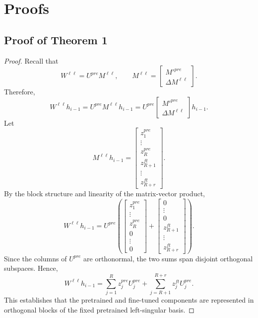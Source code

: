 \documentclass{article}
\begin{document}
\section{Proofs}
\label{app:proofs}

\subsection{Proof of Theorem 1}
\label{app:proof-linlora-retention}

\begin{proof}
Recall that
\[
W^{\ell \ell}
=
U^{pre}M^{\ell \ell},
\qquad
M^{\ell \ell}
=
\begin{bmatrix}
M'^{pre} \\
\Delta M^{\ell \ell}
\end{bmatrix}.
\]
Therefore,
\[
W^{\ell \ell}h_{i-1}
=
U^{pre}M^{\ell \ell}h_{i-1}
=
U^{pre}
\begin{bmatrix}
M'^{pre} \\
\Delta M^{\ell \ell}
\end{bmatrix}
h_{i-1}.
\]
Let
\[
M^{\ell \ell}h_{i-1}
=
\begin{bmatrix}
z^{pre}_1 \\
\vdots \\
z^{pre}_R \\
z^{ft}_{R+1} \\
\vdots \\
z^{ft}_{R+r}
\end{bmatrix}.
\]
By the block structure and linearity of the matrix-vector product,
\[
W^{\ell \ell}h_{i-1}
=
U^{pre}
\left(
\begin{bmatrix}
z^{pre}_1 \\
\vdots \\
z^{pre}_R \\
0 \\
\vdots \\
0
\end{bmatrix}
+
\begin{bmatrix}
0 \\
\vdots \\
0 \\
z^{ft}_{R+1} \\
\vdots \\
z^{ft}_{R+r}
\end{bmatrix}
\right).
\]
Since the columns of $U^{pre}$ are orthonormal, the two sums span disjoint
orthogonal subspaces. Hence,
\[
W^{\ell \ell}h_{i-1}
=
\sum\limits_{j=1}^{R} z^{pre}_j U^{pre}_j
+
\sum\limits_{j=R+1}^{R+r} z^{ft}_j U^{pre}_j .
\]
This establishes that the pretrained and fine-tuned components are represented
in orthogonal blocks of the fixed pretrained left-singular basis.
\end{proof}
\end{document}
